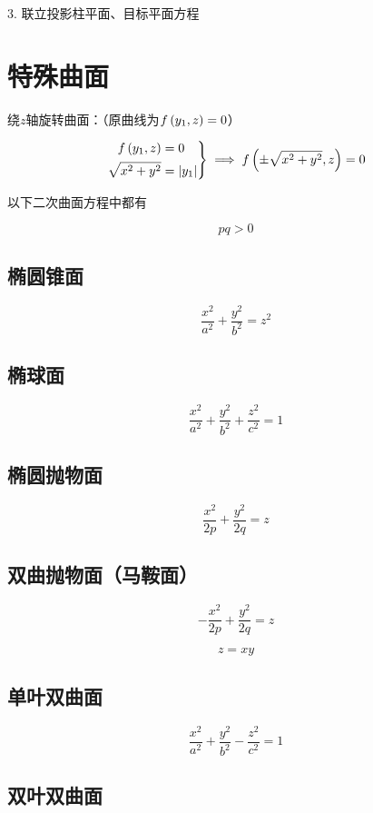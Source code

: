 \documentclass{article}
\begin{document}
3. 联立投影柱平面、目标平面方程

\section{特殊曲面}

绕$z$轴旋转曲面：（原曲线为$f\left(y_1,z\right)=0$）

\[\left.\begin{aligned}
        f\left(y_1,z\right)     & =0         \\
        \sqrt{x^2+y^2} & =\left|y_1\right|
    \end{aligned}\right\}
    \implies
    f\left(\pm\sqrt{x^2+y^2},z\right)=0\]

以下二次曲面方程中都有

\[pq>0\]

\subsection{椭圆锥面}

\[\frac{x^2}{a^2}+\frac{y^2}{b^2}=z^2\]

\subsection{椭球面}

\[\frac{x^2}{a^2}+\frac{y^2}{b^2}+\frac{z^2}{c^2}=1\]

\subsection{椭圆抛物面}

\[\frac{x^2}{2p}+\frac{y^2}{2q}=z\]

\subsection{双曲抛物面（马鞍面）}

\[-\frac{x^2}{2p}+\frac{y^2}{2q}=z\]

\[z=xy\]

\subsection{单叶双曲面}

\[\frac{x^2}{a^2}+\frac{y^2}{b^2}-\frac{z^2}{c^2}=1\]

\subsection{双叶双曲面}
\end{document}
